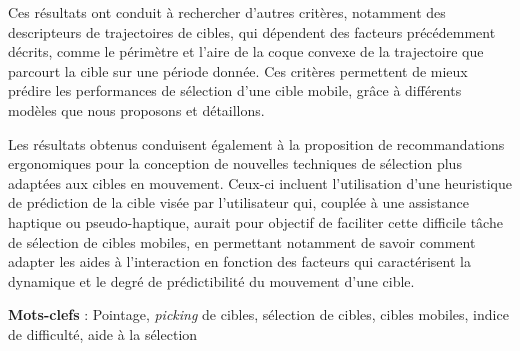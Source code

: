 	Ces résultats ont conduit à rechercher d'autres critères, notamment des descripteurs de trajectoires de cibles, qui dépendent des facteurs précédemment décrits, comme le périmètre et l'aire de la coque convexe de la trajectoire que parcourt la cible sur une période donnée. Ces critères permettent de mieux prédire les performances de sélection d'une cible mobile, grâce à différents modèles que nous proposons et détaillons.

	Les résultats obtenus conduisent également à la proposition de recommandations ergonomiques pour la conception de nouvelles techniques de sélection plus adaptées aux cibles en mouvement. Ceux-ci incluent l'utilisation d'une heuristique de prédiction de la cible visée par l’utilisateur qui, couplée à une assistance haptique ou pseudo-haptique, aurait pour objectif de faciliter cette difficile tâche de sélection de cibles mobiles, en permettant notamment de savoir comment adapter les aides à l'interaction en fonction des facteurs qui caractérisent la dynamique et le degré de prédictibilité du mouvement d'une cible.
 


\textbf{Mots-clefs} : Pointage, \emph{picking} de cibles, sélection de cibles, cibles mobiles, indice de difficulté, aide à la sélection